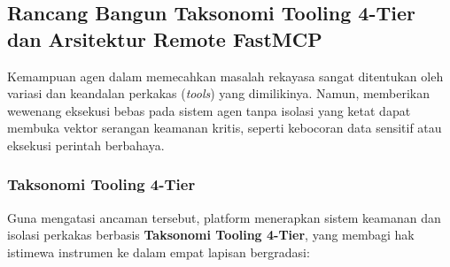 \subsection{Rancang Bangun Taksonomi Tooling 4-Tier dan Arsitektur Remote FastMCP}

Kemampuan agen dalam memecahkan masalah rekayasa sangat ditentukan oleh variasi dan keandalan perkakas (\textit{tools}) yang dimilikinya. Namun, memberikan wewenang eksekusi bebas pada sistem agen tanpa isolasi yang ketat dapat membuka vektor serangan keamanan kritis, seperti kebocoran data sensitif atau eksekusi perintah berbahaya.

\subsubsection{Taksonomi Tooling 4-Tier}
Guna mengatasi ancaman tersebut, platform menerapkan sistem keamanan dan isolasi perkakas berbasis \textbf{Taksonomi Tooling 4-Tier}, yang membagi hak istimewa instrumen ke dalam empat lapisan bergradasi:

